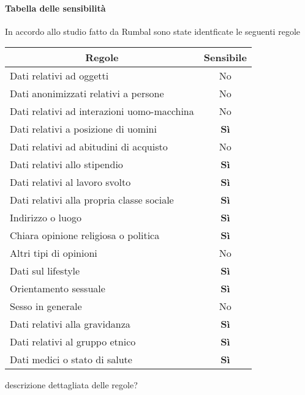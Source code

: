 \paragraph{Tabella delle sensibilità}
In accordo allo studio fatto da Rumbal sono state identficate le seguenti regole
\FloatBarrier
\begin{table}[h]
\begin{tabular}{|l|c|}
\hline
\multicolumn{1}{|c|}{\textbf{Regole}} & \textbf{Sensibile} \\ \hline
Dati relativi ad oggetti & No \\ \hline
Dati anonimizzati relativi a persone & No \\ \hline
Dati relativi ad interazioni uomo-macchina & No \\ \hline
Dati relativi a posizione di uomini & \textbf{Sì} \\ \hline
Dati relativi ad abitudini di acquisto & No \\ \hline
Dati relativi allo stipendio & \textbf{Sì} \\ \hline
Dati relativi al lavoro svolto & \textbf{Sì} \\ \hline
Dati relativi alla propria classe sociale & \textbf{Sì} \\ \hline
Indirizzo o luogo & \textbf{Sì} \\ \hline
Chiara opinione religiosa o politica & \textbf{Sì} \\ \hline
Altri tipi di opinioni & No \\ \hline
Dati sul lifestyle & \textbf{Sì} \\ \hline
Orientamento sessuale & \textbf{Sì} \\ \hline
Sesso in generale & No \\ \hline
Dati relativi alla gravidanza & \textbf{Sì} \\ \hline
Dati relativi al gruppo etnico & \textbf{Sì} \\ \hline
Dati medici o stato di salute & \textbf{Sì} \\ \hline
\end{tabular}
\end{table}
\FloatBarrier
descrizione dettagliata delle regole?\newline
